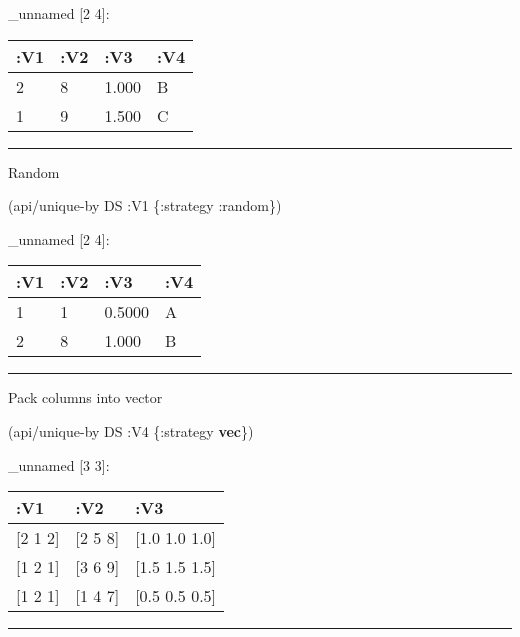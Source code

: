 \documentclass[]{article}
\newenvironment{Shaded}{\begin{snugshade}}{\end{snugshade}}
\newcommand{\KeywordTok}[1]{\textcolor[rgb]{0.13,0.29,0.53}{\textbf{#1}}}
\newcommand{\AttributeTok}[1]{\textcolor[rgb]{0.77,0.63,0.00}{#1}}
\newcommand{\NormalTok}[1]{#1}
\begin{document}
\_unnamed {[}2 4{]}:

\begin{longtable}[]{@{}llll@{}}
\toprule
:V1 & :V2 & :V3 & :V4\tabularnewline
\midrule
\endhead
2 & 8 & 1.000 & B\tabularnewline
1 & 9 & 1.500 & C\tabularnewline
\bottomrule
\end{longtable}

\begin{center}\rule{0.5\linewidth}{0.5pt}\end{center}

Random

\begin{Shaded}
\begin{Highlighting}[]
\NormalTok{(api/unique-by DS }\AttributeTok{:V1}\NormalTok{ \{}\AttributeTok{:strategy} \AttributeTok{:random}\NormalTok{\})}
\end{Highlighting}
\end{Shaded}

\_unnamed {[}2 4{]}:

\begin{longtable}[]{@{}llll@{}}
\toprule
:V1 & :V2 & :V3 & :V4\tabularnewline
\midrule
\endhead
1 & 1 & 0.5000 & A\tabularnewline
2 & 8 & 1.000 & B\tabularnewline
\bottomrule
\end{longtable}

\begin{center}\rule{0.5\linewidth}{0.5pt}\end{center}

Pack columns into vector

\begin{Shaded}
\begin{Highlighting}[]
\NormalTok{(api/unique-by DS }\AttributeTok{:V4}\NormalTok{ \{}\AttributeTok{:strategy} \KeywordTok{vec}\NormalTok{\})}
\end{Highlighting}
\end{Shaded}

\_unnamed {[}3 3{]}:

\begin{longtable}[]{@{}lll@{}}
\toprule
:V1 & :V2 & :V3\tabularnewline
\midrule
\endhead
{[}2 1 2{]} & {[}2 5 8{]} & {[}1.0 1.0 1.0{]}\tabularnewline
{[}1 2 1{]} & {[}3 6 9{]} & {[}1.5 1.5 1.5{]}\tabularnewline
{[}1 2 1{]} & {[}1 4 7{]} & {[}0.5 0.5 0.5{]}\tabularnewline
\bottomrule
\end{longtable}

\begin{center}\rule{0.5\linewidth}{0.5pt}\end{center}
\end{document}

